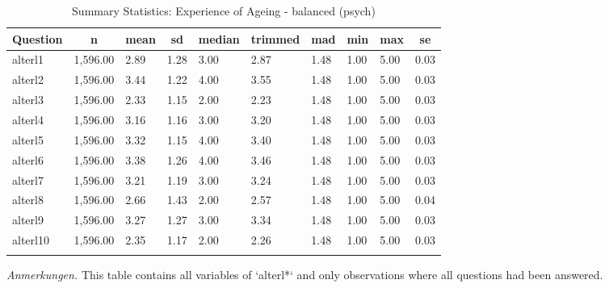 \documentclass[
  doc]{apa6}
\begin{document}
\begin{table}[tbp]

\begin{center}
\begin{threeparttable}

\caption{\label{tab:tabsumstatalterpsychbal}Summary Statistics: Experience of Ageing - balanced (psych)}

\begin{tabular}{llllllllll}
\toprule
Question & \multicolumn{1}{c}{n} & \multicolumn{1}{c}{mean} & \multicolumn{1}{c}{sd} & \multicolumn{1}{c}{median} & \multicolumn{1}{c}{trimmed} & \multicolumn{1}{c}{mad} & \multicolumn{1}{c}{min} & \multicolumn{1}{c}{max} & \multicolumn{1}{c}{se}\\
\midrule
alterl1 & 1,596.00 & 2.89 & 1.28 & 3.00 & 2.87 & 1.48 & 1.00 & 5.00 & 0.03\\
alterl2 & 1,596.00 & 3.44 & 1.22 & 4.00 & 3.55 & 1.48 & 1.00 & 5.00 & 0.03\\
alterl3 & 1,596.00 & 2.33 & 1.15 & 2.00 & 2.23 & 1.48 & 1.00 & 5.00 & 0.03\\
alterl4 & 1,596.00 & 3.16 & 1.16 & 3.00 & 3.20 & 1.48 & 1.00 & 5.00 & 0.03\\
alterl5 & 1,596.00 & 3.32 & 1.15 & 4.00 & 3.40 & 1.48 & 1.00 & 5.00 & 0.03\\
alterl6 & 1,596.00 & 3.38 & 1.26 & 4.00 & 3.46 & 1.48 & 1.00 & 5.00 & 0.03\\
alterl7 & 1,596.00 & 3.21 & 1.19 & 3.00 & 3.24 & 1.48 & 1.00 & 5.00 & 0.03\\
alterl8 & 1,596.00 & 2.66 & 1.43 & 2.00 & 2.57 & 1.48 & 1.00 & 5.00 & 0.04\\
alterl9 & 1,596.00 & 3.27 & 1.27 & 3.00 & 3.34 & 1.48 & 1.00 & 5.00 & 0.03\\
alterl10 & 1,596.00 & 2.35 & 1.17 & 2.00 & 2.26 & 1.48 & 1.00 & 5.00 & 0.03\\
\bottomrule
\addlinespace
\end{tabular}

\begin{tablenotes}[para]
\normalsize{\textit{Anmerkungen.} This table contains all variables of `alterl*` and only observations where all questions had been answered.}
\end{tablenotes}

\end{threeparttable}
\end{center}

\end{table}
\end{document}
